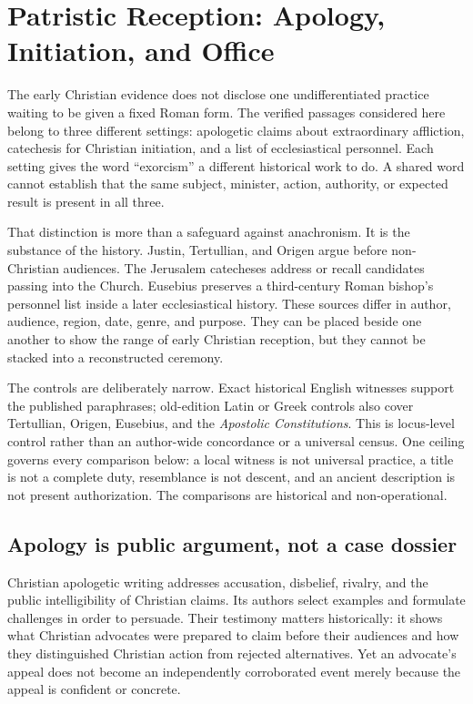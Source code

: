 \section{Patristic Reception: Apology, Initiation, and Office}

The early Christian evidence does not disclose one undifferentiated practice
waiting to be given a fixed Roman form. The verified passages considered here
belong to three different settings: apologetic claims about extraordinary
affliction, catechesis for Christian initiation, and a list of ecclesiastical
personnel. Each setting gives the word ``exorcism'' a different historical
work to do. A shared word cannot establish that the same subject, minister,
action, authority, or expected result is present in all three.

That distinction is more than a safeguard against anachronism. It is the
substance of the history. Justin, Tertullian, and Origen argue before
non-Christian audiences. The Jerusalem catecheses address or recall candidates
passing into the Church. Eusebius preserves a third-century Roman bishop's personnel list
inside a later ecclesiastical history. These sources differ in author,
audience, region, date, genre, and purpose. They can be placed beside one
another to show the range of early Christian reception, but they cannot be
stacked into a reconstructed ceremony.

The controls are deliberately narrow. Exact historical English witnesses
support the published paraphrases; old-edition Latin or Greek controls also
cover Tertullian, Origen, Eusebius, and the \emph{Apostolic Constitutions}.
This is locus-level control rather than an author-wide concordance or a
universal census. One ceiling governs every comparison below: a local witness
is not universal practice, a title is not a complete duty, resemblance is not
descent, and an ancient description is not present authorization. The
comparisons are historical and non-operational.

\subsection{Apology is public argument, not a case dossier}

Christian apologetic writing addresses accusation, disbelief, rivalry, and
the public intelligibility of Christian claims. Its authors select examples
and formulate challenges in order to persuade. Their testimony matters
historically: it shows what Christian advocates were prepared to claim before
their audiences and how they distinguished Christian action from rejected
alternatives. Yet an advocate's appeal does not become an independently
corroborated event merely because the appeal is confident or concrete.

